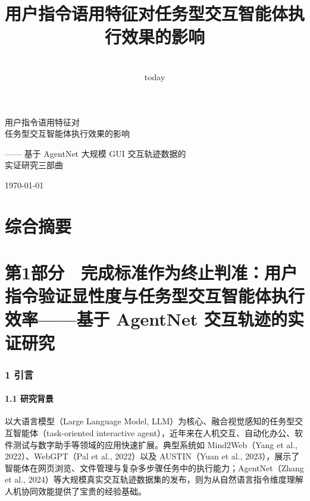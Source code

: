 \documentclass[12pt,a4paper,openany,oneside]{ctexrep}
\title{用户指令语用特征对任务型交互智能体执行效果的影响}
\author{}
\date{\\today}
\begin{document}

\begin{titlepage}
\thispagestyle{empty}

\begin{center}

\vspace*{4cm}

{\heiti 用户指令语用特征对\\[6pt]
任务型交互智能体执行效果的影响}

\vspace{20pt}

{\kaishu —— 基于 AgentNet 大规模 GUI 交互轨迹数据的\\[4pt]
实证研究三部曲}

\vspace{40pt}

{}
\vfill

{\today}

\end{center}

\end{titlepage}

\chapter*{综合摘要}
\tableofcontents
\newpage




\newpage

\newpage

\chapter{第1部分　完成标准作为终止判准：用户指令验证显性度与任务型交互智能体执行效率——基于 AgentNet 交互轨迹的实证研究}


\subsection{1 引言}


\subsubsection{1.1 研究背景}


以大语言模型（Large Language Model, LLM）为核心、融合视觉感知的任务型交互智能体（task-oriented interactive agent），近年来在人机交互、自动化办公、软件测试与数字助手等领域的应用快速扩展。典型系统如 Mind2Web（Yang et al., 2022）、WebGPT（Pal et al., 2022）以及 AUSTIN（Yuan et al., 2023），展示了智能体在网页浏览、文件管理与复杂多步骤任务中的执行能力；AgentNet（Zhang et al., 2024）等大规模真实交互轨迹数据集的发布，则为从自然语言指令维度理解人机协同效能提供了宝贵的经验基础。
\end{document}
